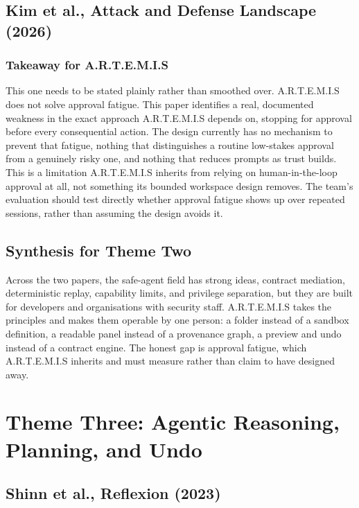 \documentclass[11pt,a4paper]{report}
\newcommand{\artemis}{A.R.T.E.M.I.S}
\begin{document}
\subsection{Kim et al., Attack and Defense Landscape (2026)}

\subsubsection{Takeaway for \artemis{}}

This one needs to be stated plainly rather than smoothed over.
\artemis{} does not solve approval fatigue. This paper identifies a
real, documented weakness in the exact approach \artemis{} depends on,
stopping for approval before every consequential action. The design
currently has no mechanism to prevent that fatigue, nothing that
distinguishes a routine low-stakes approval from a genuinely risky one,
and nothing that reduces prompts as trust builds. This is a limitation
\artemis{} inherits from relying on human-in-the-loop approval at all,
not something its bounded workspace design removes. The team's
evaluation should test directly whether approval fatigue shows up over
repeated sessions, rather than assuming the design avoids it.

\subsection{Synthesis for Theme Two}

Across the two papers, the safe-agent field has strong ideas, contract
mediation, deterministic replay, capability limits, and privilege
separation, but they are built for developers and organisations with
security staff. \artemis{} takes the principles and makes them operable
by one person: a folder instead of a sandbox definition, a readable
panel instead of a provenance graph, a preview and undo instead of a
contract engine. The honest gap is approval fatigue, which \artemis{}
inherits and must measure rather than claim to have designed away.

\section{Theme Three: Agentic Reasoning, Planning, and Undo}

\subsection{Shinn et al., Reflexion (2023)}
\end{document}
